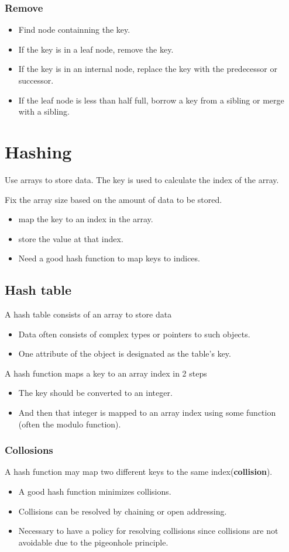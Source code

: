 \documentclass[letterpaper,12pt]{article}
\begin{document}
\subsubsection{Remove}
\begin{itemize}
    \item Find node containning the key.
    \item If the key is in a leaf node, remove the key.
    \item If the key is in an internal node, replace the key with the predecessor or successor.
    \item If the leaf node is less than half full, borrow a key from a sibling or merge with a sibling.
\end{itemize}
\section{Hashing}
Use arrays to store data. The key is used to calculate the index of the array.

Fix the array size based on the amount of data to be stored. \begin{itemize}
    \item map the key to an index in the array.
    \item store the value at that index.
    \item Need a good hash function to map keys to indices.
\end{itemize}
\subsection{Hash table}
A hash table consists of an array to store data\begin{itemize}
    \item Data often consists of complex types or pointers to such objects.
    \item One attribute of the object is designated as the table's key.
\end{itemize}
A hash function maps a key to an array index in 2 steps\begin{itemize}
    \item The key should be converted to an integer.
    \item And then that integer is mapped to an array index using some function (often the modulo function).
\end{itemize}
\subsubsection{Collosions}
A hash function may map two different keys to the same index(\textbf{collision}). \begin{itemize}
    \item A good hash function minimizes collisions.
    \item Collisions can be resolved by chaining or open addressing.
    \item Necessary to have a policy for resolving collisions since collisions are not avoidable due to the pigeonhole principle.
\end{itemize}
\end{document}
